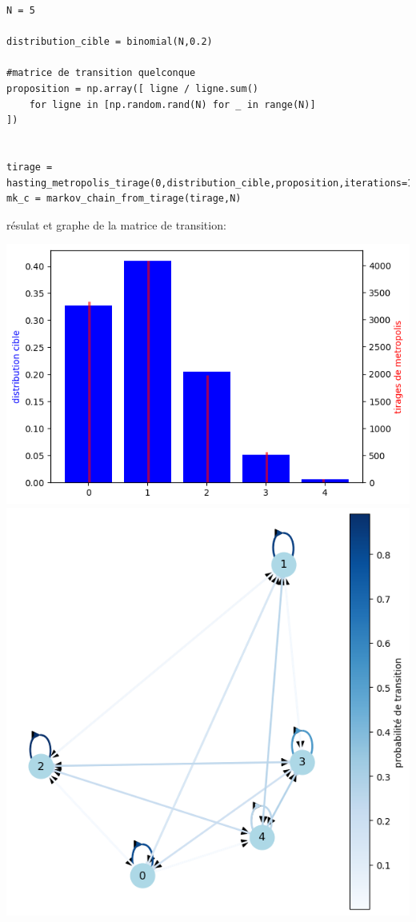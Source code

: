 \documentclass{article}
\begin{document}
\begin{verbatim}
N = 5

distribution_cible = binomial(N,0.2)

#matrice de transition quelconque
proposition = np.array([ ligne / ligne.sum()
    for ligne in [np.random.rand(N) for _ in range(N)]
])


tirage = hasting_metropolis_tirage(0,distribution_cible,proposition,iterations=10_000)
mk_c = markov_chain_from_tirage(tirage,N)
\end{verbatim}

résulat et graphe de la matrice de transition:

\includegraphics[scale=0.25]{loi bin.png}
\includegraphics[scale=0.25]{loi bin graph.png}
\end{document}
